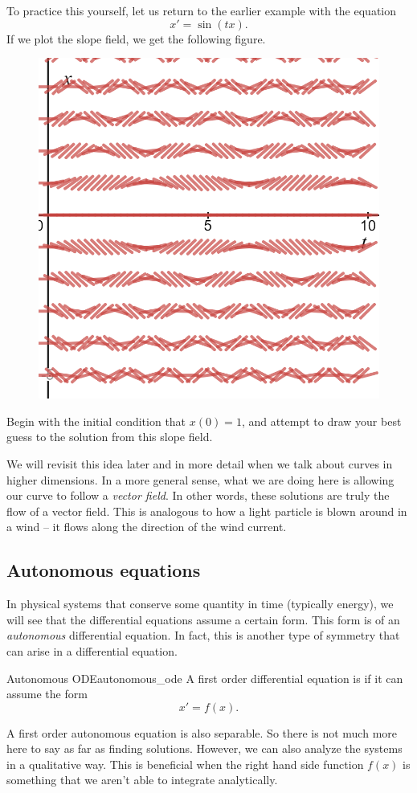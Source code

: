             To practice this yourself, let us return to the earlier example with the equation
            \[
            x'=\sin(tx).
            \]
            If we plot the slope field, we get the following figure.
            \begin{figure}[H]
                \centering
                \includegraphics[width=.6\textwidth]{Figures_Part_1/slope_field_nonlinear.png}
            \end{figure}
            Begin with the initial condition that $x(0)=1$, and attempt to draw your best guess to the solution from this slope field.

            We will revisit this idea later and in more detail when we talk about curves in higher dimensions.  In a more general sense, what we are doing here is allowing our curve to follow a \emph{vector field}.  In other words, these solutions are truly the flow of a vector field.  This is analogous to how a light particle is blown around in a wind -- it flows along the direction of the wind current.



            \subsection{Autonomous equations}

                In physical systems that conserve some quantity in time (typically energy), we will see that the differential equations assume a certain form.  This form is of an \emph{autonomous} differential equation. In fact, this is another type of symmetry that can arise in a differential equation.

                \begin{df}{Autonomous ODE}{autonomous_ode}
                    A first order differential equation is  if it can assume the form
                    \[
                    x'=f(x).
                    \]
                \end{df}
                \noindent A first order autonomous equation is also separable. So there is not much more here to say as far as finding solutions. However, we can also analyze the systems in a qualitative way.  This is beneficial when the right hand side function $f(x)$ is something that we aren't able to integrate analytically.

